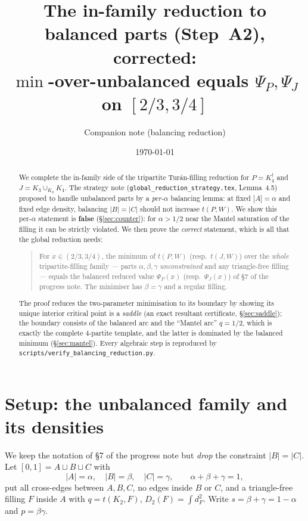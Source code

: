 \documentclass[11pt]{amsart}
\title[The in-family reduction to balanced parts]%
{The in-family reduction to balanced parts (Step~A2), corrected:\\
$\min$-over-unbalanced equals $\Psi_P,\Psi_J$ on $[2/3,3/4]$}
\author{Companion note (balancing reduction)}
\date{\today}
\theoremstyle{definition}
\begin{document}
\maketitle

\begin{abstract}
We complete the in-family side of the tripartite Tur\'an-filling reduction
for $P=K_4^{\dagger}$ and $J=K_3\cup_{K_2}K_4$.  The strategy note
(\texttt{global\_reduction\_strategy.tex}, Lemma~4.5) proposed to handle
unbalanced parts by a \emph{per-$\alpha$} balancing lemma: at fixed
$|A|=\alpha$ and fixed edge density, balancing $|B|=|C|$ should not increase
$t(P,W)$.  We show this per-$\alpha$ statement is \textbf{false}
(\S\ref{sec:counter}): for $\alpha>1/2$ near the Mantel saturation of the
filling it can be strictly violated.  We then prove the \emph{correct}
statement, which is all that the global reduction needs:

\begin{quote}
For $x\in(2/3,3/4)$, the minimum of $t(P,W)$ (resp.\ $t(J,W)$) over the
\emph{whole} tripartite-filling family --- parts $\alpha,\beta,\gamma$
\emph{unconstrained} and any triangle-free filling --- equals the balanced
reduced value $\Psi_P(x)$ (resp.\ $\Psi_J(x)$) of \S7 of the progress note.
The minimiser has $\beta=\gamma$ and a regular filling.
\end{quote}

The proof reduces the two-parameter minimisation to its boundary by showing
its unique interior critical point is a \emph{saddle} (an exact resultant
certificate, \S\ref{sec:saddle}); the boundary consists of the balanced arc
and the ``Mantel arc'' $q=1/2$, which is exactly the complete $4$-partite
template, and the latter is dominated by the balanced minimum
(\S\ref{sec:mantel}).  Every algebraic step is reproduced by
\texttt{scripts/verify\_balancing\_reduction.py}.
\end{abstract}

\tableofcontents

\section{Setup: the unbalanced family and its densities}
\label{sec:setup}

We keep the notation of \S7 of the progress note but \emph{drop} the
constraint $|B|=|C|$.  Let $[0,1]=A\sqcup B\sqcup C$ with
\[
   |A|=\alpha,\quad |B|=\beta,\quad |C|=\gamma,\qquad \alpha+\beta+\gamma=1,
\]
put all cross-edges between $A,B,C$, no edges inside $B$ or $C$, and a
triangle-free filling $F$ inside $A$ with $q=t(K_2,F)$,
$D_2(F)=\int d_F^2$.  Write $s=\beta+\gamma=1-\alpha$ and $p=\beta\gamma$.
\end{document}
